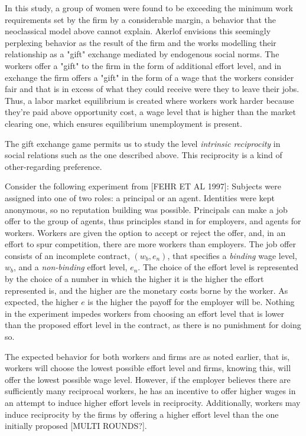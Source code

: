 \message{ !name(tese.tex)}\documentclass{article}
\begin{document}
In this study, a group of women were found to be exceeding the minimum work requirements set by the firm by a considerable margin, a behavior that the neoclassical model above cannot explain. Akerlof envisions this seemingly perplexing behavior as the result of the firm and the works modelling their relationship as a "gift" exchange mediated by endogenous social norms. The workers offer a "gift" to the firm in the form of additional effort level, and in exchange the firm offers a "gift" in the form of a wage that the workers consider fair and that is in excess of what they could receive were they to leave their jobs. Thus, a labor market equilibrium is created where workers work harder because they're paid above opportunity cost, a wage level that is higher than the market clearing one, which ensures equilibrium unemployment is present. 

The gift exchange game permits us to study the level \textit{intrinsic reciprocity} in social relations such as the one described above. This reciprocity is a kind of other-regarding preference. 

Consider the following experiment from [FEHR ET AL 1997]: Subjects were assigned into one of two roles: a principal or an agent. Identities were kept anonymous, so no reputation building was possible. Principals can make a job offer to the group of agents, thus principles stand in for employers, and agents for workers.  Workers are given the option to accept or reject the offer, and, in an effort to spur competition, there are more workers than employers. The job offer consists of an incomplete contract, $\left ( w_b,e_n \right)$, that specifies a \textit{binding} wage level, $w_b$, and a \textit{non-binding} effort level, $e_n$. The choice of the effort level is represented by the choice of a number in which the higher it is the higher the effort represented is, and the higher are the monetary costs borne by the worker. As expected, the higher $e$ is the higher the payoff for the employer will be. Nothing in the experiment impedes workers from choosing an effort level that is lower than the proposed effort level in the contract, as there is no punishment for doing so. 

The expected behavior for both workers and firms are as noted earlier, that is, workers will choose the lowest possible effort level and firms, knowing this, will offer the lowest possible wage level. However, if the employer believes there are sufficiently many reciprocal workers, he has an incentive to offer higher wages in an attempt to induce higher effort levels in reciprocity. Additionally, workers may induce reciprocity by the firms by offering a higher effort level than the one initially proposed [MULTI ROUNDS?].
\\
\end{document}

